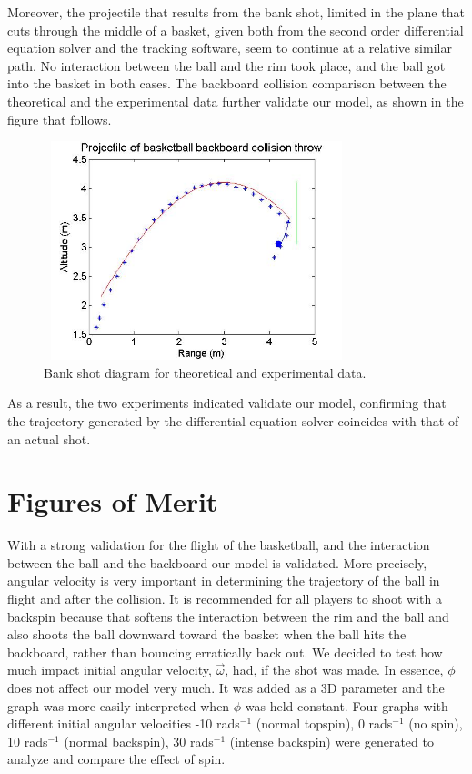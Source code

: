 \documentclass[twocolumn]{IEEEtran}
\begin{document}
Moreover, the projectile that results from the bank shot, limited in the plane that cuts through the middle of a basket, given both from the second order differential equation solver and the tracking software, seem to continue at a relative similar path. No interaction between the ball and the rim took place, and the ball got into the basket in both cases. The backboard collision comparison between the theoretical and the experimental data further validate our model, as shown in the figure that follows.
\begin{figure}[!ht]
\includegraphics[height=2.5in,width = 3.5in]{newBackboard}
\caption{Bank shot diagram for theoretical and experimental data.}
\end{figure}
As a result, the two experiments indicated validate our model, confirming that the trajectory generated by the differential equation solver coincides with that of an actual shot.

\section{Figures of Merit}

With a strong validation for the flight of the basketball, and the interaction between the ball and the backboard our model is validated. More precisely, angular velocity is very important in determining the trajectory of the ball in flight and after the collision. It is recommended for all players to shoot with a backspin because that softens the interaction between the rim and the ball and also shoots the ball downward toward the basket when the ball hits the backboard, rather than bouncing erratically back out. We decided to test how much impact initial angular velocity, $\vec \omega$, had, if the shot was made. In essence, $\phi$ does not affect our model very much. It was added as a 3D parameter and the graph was more easily interpreted when $\phi$ was held constant. Four graphs with different initial angular velocities -10 rads$^{-1}$ (normal topspin), 0 rads$^{-1}$ (no spin), 10 rads$^{-1}$ (normal backspin), 30 rads$^{-1}$ (intense backspin) were generated to analyze and compare the effect of spin.
\end{document}
